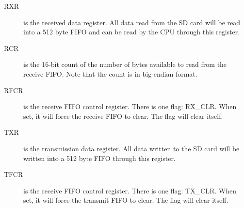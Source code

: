 \begin{description}
    \item[RXR] is the received data register. All data read from the SD card will be read into a 512 byte FIFO and can be read by the CPU through this register.

    \item[RCR] is the 16-bit count of the number of bytes available to read from the receive FIFO. Note that the count is in big-endian format.

    \item[RFCR] is the receive FIFO control register. There is one flag: RX\_CLR. When set, it will force the receive FIFO to clear. The flag will clear itself.

    \item[TXR] is the transmission data register. All data written to the SD card will be written into a 512 byte FIFO through this register.

    \item[TFCR] is the receive FIFO control register. There is one flag: TX\_CLR. When set, it will force the transmit FIFO to clear. The flag will clear itself.

\end{description}
